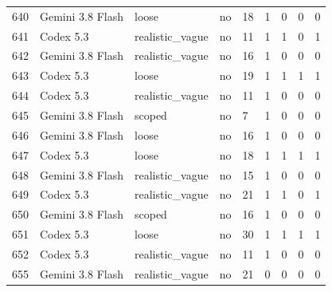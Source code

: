 \begin{tabular}{lllllllll}
640 & Gemini 3.8 Flash & loose & no & 18 & 1 & 0 & 0 & 0 \\
641 & Codex 5.3 & realistic\_vague & no & 11 & 1 & 1 & 0 & 1 \\
642 & Gemini 3.8 Flash & realistic\_vague & no & 16 & 1 & 0 & 0 & 0 \\
643 & Codex 5.3 & loose & no & 19 & 1 & 1 & 1 & 1 \\
644 & Codex 5.3 & realistic\_vague & no & 11 & 1 & 0 & 0 & 0 \\
645 & Gemini 3.8 Flash & scoped & no & 7 & 1 & 0 & 0 & 0 \\
646 & Gemini 3.8 Flash & loose & no & 16 & 1 & 0 & 0 & 0 \\
647 & Codex 5.3 & loose & no & 18 & 1 & 1 & 1 & 1 \\
648 & Gemini 3.8 Flash & realistic\_vague & no & 15 & 1 & 0 & 0 & 0 \\
649 & Codex 5.3 & realistic\_vague & no & 21 & 1 & 1 & 0 & 1 \\
650 & Gemini 3.8 Flash & scoped & no & 16 & 1 & 0 & 0 & 0 \\
651 & Codex 5.3 & loose & no & 30 & 1 & 1 & 1 & 1 \\
652 & Codex 5.3 & realistic\_vague & no & 11 & 1 & 0 & 0 & 0 \\
655 & Gemini 3.8 Flash & realistic\_vague & no & 21 & 0 & 0 & 0 & 0 \\
\bottomrule
\end{tabular}
